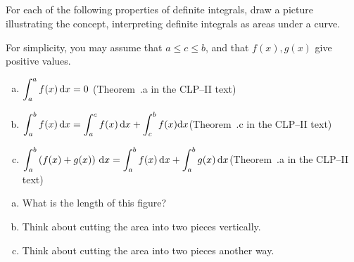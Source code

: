 %
%

\subsection*{\Conceptual}
\begin{question}
For each of the following properties of definite integrals, draw a picture illustrating the concept, interpreting definite integrals as areas under a curve.

For simplicity, you may assume that $a \leq c \leq b$, and that $f(x),g(x)$ give positive values.
\begin{enumerate}[(a)]
\item $\displaystyle\int_a^a f(x)\,\mathrm{d}x=0$\qquad
(Theorem~.a in the CLP--II text)
\item $\displaystyle\int_a^b f(x)\,\mathrm{d}x= \displaystyle\int_a^c f(x)\,\mathrm{d}x + \int_c^b f(x)\mathrm{d}x $\qquad (Theorem~.c in the CLP--II text)
\item $\displaystyle\int_a^b \left( f(x) + g(x) \right)\,\mathrm{d}x
= \displaystyle\int_a^b f(x)\,\mathrm{d}x + \displaystyle\int_a^b g(x)\,\mathrm{d}x$\qquad (Theorem~.a  in the CLP--II text)
\end{enumerate}
\end{question}
\begin{hint}
\begin{enumerate}[(a)]
\item What is the length of this figure?
\item Think about cutting the area into two pieces vertically.
\item Think about cutting the area into two pieces another way.
\end{enumerate}
\end{hint}

